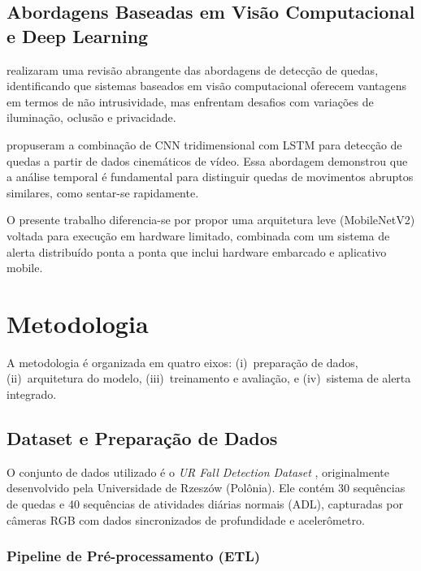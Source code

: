 \documentclass[12pt,a4paper]{article}
\begin{document}
\subsection{Abordagens Baseadas em Visão Computacional e Deep Learning}

\citet{mubashir2013} realizaram uma revisão abrangente das abordagens de detecção de quedas, identificando que sistemas baseados em visão computacional oferecem vantagens em termos de não intrusividade, mas enfrentam desafios com variações de iluminação, oclusão e privacidade.

\citet{lu2019} propuseram a combinação de CNN tridimensional com LSTM para detecção de quedas a partir de dados cinemáticos de vídeo. Essa abordagem demonstrou que a análise temporal é fundamental para distinguir quedas de movimentos abruptos similares, como sentar-se rapidamente.

O presente trabalho diferencia-se por propor uma arquitetura leve (MobileNetV2) voltada para execução em hardware limitado, combinada com um sistema de alerta distribuído ponta a ponta que inclui hardware embarcado e aplicativo mobile.

\section{Metodologia}

A metodologia é organizada em quatro eixos: (i)~preparação de dados, (ii)~arquitetura do modelo, (iii)~treinamento e avaliação, e (iv)~sistema de alerta integrado.

\subsection{Dataset e Preparação de Dados}

O conjunto de dados utilizado é o \textit{UR Fall Detection Dataset} \citep{kwolek2014}, originalmente desenvolvido pela Universidade de Rzeszów (Polônia). Ele contém 30 sequências de quedas e 40 sequências de atividades diárias normais (ADL), capturadas por câmeras RGB com dados sincronizados de profundidade e acelerômetro.

\subsubsection{Pipeline de Pré-processamento (ETL)}
\end{document}
